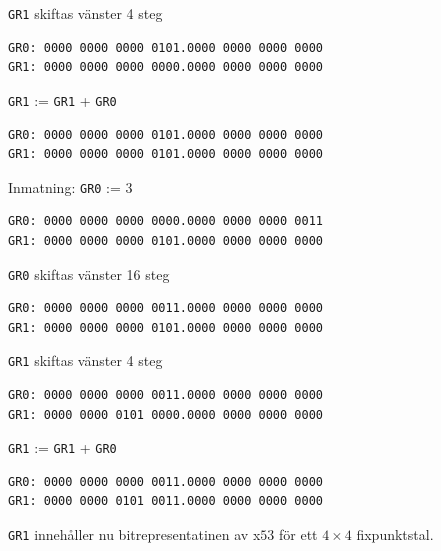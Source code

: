 \documentclass[]{article}
\begin{document}
\begin{appendices}
\noindent
\texttt{GR1} skiftas vänster 4 steg
\begin{framed}
\begin{verbatim}
GR0: 0000 0000 0000 0101.0000 0000 0000 0000
GR1: 0000 0000 0000 0000.0000 0000 0000 0000
\end{verbatim}
\end{framed}

\noindent
\texttt{GR1} := \texttt{GR1} + \texttt{GR0}
\begin{framed}
\begin{verbatim}
GR0: 0000 0000 0000 0101.0000 0000 0000 0000
GR1: 0000 0000 0000 0101.0000 0000 0000 0000
\end{verbatim}
\end{framed}

\newpage

\noindent
Inmatning: \texttt{GR0} := 3
\begin{framed}
\begin{verbatim}
GR0: 0000 0000 0000 0000.0000 0000 0000 0011
GR1: 0000 0000 0000 0101.0000 0000 0000 0000
\end{verbatim}
\end{framed}

\noindent
\texttt{GR0} skiftas vänster 16 steg
\begin{framed}
\begin{verbatim}
GR0: 0000 0000 0000 0011.0000 0000 0000 0000
GR1: 0000 0000 0000 0101.0000 0000 0000 0000
\end{verbatim}
\end{framed}

\noindent
\texttt{GR1} skiftas vänster 4 steg
\begin{framed}
\begin{verbatim}
GR0: 0000 0000 0000 0011.0000 0000 0000 0000
GR1: 0000 0000 0101 0000.0000 0000 0000 0000
\end{verbatim}
\end{framed}

\noindent
\texttt{GR1} := \texttt{GR1} + \texttt{GR0}
\begin{framed}
\begin{verbatim}
GR0: 0000 0000 0000 0011.0000 0000 0000 0000
GR1: 0000 0000 0101 0011.0000 0000 0000 0000
\end{verbatim}
\end{framed}

\noindent
\texttt{GR1} innehåller nu bitrepresentatinen av x$53$ för ett $4 \times 4$ fixpunktstal.
\end{appendices}
\end{document}
